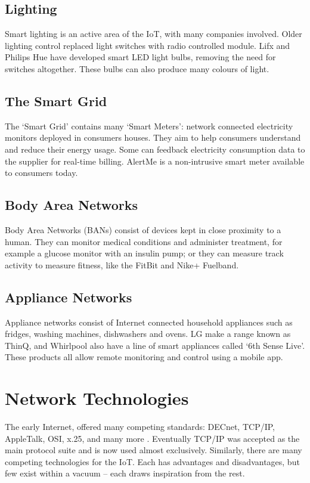 \documentclass[10pt,journal,compsoc]{IEEEtran}
\begin{document}
\subsection{Lighting}
Smart lighting is an active area of the IoT, with many companies involved.
Older lighting control replaced light switches with radio controlled module.
Lifx and Philips Hue have developed smart LED light bulbs, removing the need
for switches altogether. These bulbs can also produce many colours of light. 

\subsection{The Smart Grid}
The `Smart Grid' contains many `Smart Meters': network connected electricity
monitors deployed in consumers houses. They aim to help consumers understand
and reduce their energy usage.  Some can feedback electricity consumption data
to the supplier for real-time billing.  AlertMe is a non-intrusive smart meter
available to consumers today. 

\subsection{Body Area Networks}
Body Area Networks (BANs) consist of devices kept in close proximity to a
human. They can monitor medical conditions and administer treatment, for
example a glucose monitor with an insulin pump; or they can measure track
activity to measure fitness, like the FitBit and Nike+ Fuelband. 

\subsection{Appliance Networks} 
Appliance networks consist of Internet connected household appliances such as
fridges, washing machines, dishwashers and ovens.  LG make a range known as
ThinQ, and Whirlpool also have a line of smart appliances called `6th Sense
Live'. These products all allow remote monitoring and control using a mobile
app.


\section{Network Technologies}
The early Internet, offered many competing standards: DECnet, TCP/IP,
AppleTalk, OSI, x.25, and many more \cite{Cerf1993}. Eventually TCP/IP was
accepted as the main protocol suite and is now used almost exclusively.
Similarly, there are many competing technologies for the IoT. Each has
advantages and disadvantages, but few exist within a vacuum -- each draws
inspiration from the rest. 
\end{document}
